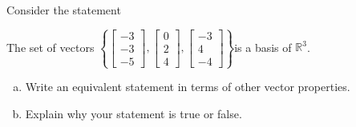 
\begin{exerciseStatement}


Consider the statement 
\begin{center}\begin{minipage}{0.8\textwidth}
 The set of vectors \( \left\{ \left[\begin{array}{c}
-3 \\
-3 \\
-5
\end{array}\right] , \left[\begin{array}{c}
0 \\
2 \\
4
\end{array}\right] , \left[\begin{array}{c}
-3 \\
4 \\
-4
\end{array}\right] \right\} \)is a basis of \(\mathbb{R}^3\). 
\end{minipage}\end{center}
    


\begin{enumerate}[(a)]
\item  Write an equivalent statement in terms of other vector properties.
\item  Explain why your statement is true or false.
\end{enumerate}
    
\end{exerciseStatement}
    
